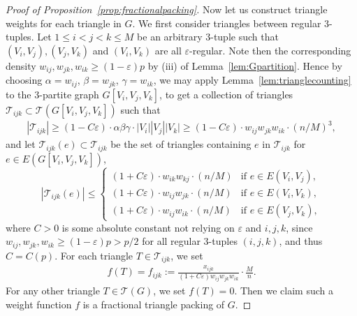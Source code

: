 \documentclass[10pt,a4paper]{amsart}
\newcommand\dT{\mathcal{T}}
\renewcommand\ge{\geqslant}
\renewcommand\geq{\geqslant}
\renewcommand\le{\leqslant}
\renewcommand\leq{\leqslant}
\begin{document}
\begin{proof}[Proof of Proposition~\ref{prop:fractionalpacking}]
Now let us construct triangle weights for each triangle in $G$. We first consider triangles between regular $3$-tuples. Let $1\leq i<j<k\leq M$ be an arbitrary 3-tuple such that $(V_i,V_j),(V_j,V_k)$ and $(V_i,V_k)$ are all $\varepsilon$-regular. Note then the corresponding density $w_{ij},w_{jk}, w_{ik}\geq(1-\varepsilon)p$ by (iii) of Lemma~\ref{lem:Gpartition}. Hence by choosing $\alpha=w_{ij}$, $\beta= w_{jk}$, $\gamma=w_{ik}$, we may apply Lemma~\ref{lem:trianglecounting} to the $3$-partite graph $G[V_i,V_j,V_k]$, to get a collection of triangles $\dT_{ijk}\subset \dT(G[V_i,V_j,V_k])$ such that
\begin{align}\label{eq:dTijk}
|\dT_{ijk}|\ge(1-C\varepsilon)\cdot\alpha\beta\gamma\cdot |V_i||V_j||V_k|\geq (1-C\varepsilon)\cdot w_{ij}w_{jk}w_{ik}\cdot(n/M)^3,   
\end{align}
and let $\dT_{ijk}(e)\subset\dT_{ijk}$ be the set of triangles containing $e$ in $\dT_{ijk}$ for $e\in E(G[V_i,V_j,V_k])$,
\begin{equation}\label{eq:Taue'}
|\dT_{ijk}(e)|\le
\begin{cases}
(1+C\varepsilon)\cdot w_{ik}w_{kj}\cdot (n/M) & \text{if } e \in E(V_i,V_j), \\[4pt]
(1+C\varepsilon)\cdot w_{ij}w_{jk}\cdot (n/M) & \text{if } e \in E(V_i,V_k), \\[4pt]
(1+C\varepsilon)\cdot w_{ij}w_{ik}\cdot(n/M) & \text{if } e \in E(V_j,V_k),
\end{cases}
\end{equation}
where $C>0$ is some absolute constant not relying on $\varepsilon$ and $i,j,k$, since $w_{ij},w_{jk}, w_{ik}\geq(1-\varepsilon)p>p/2$ for all regular 3-tuples $(i,j,k)$, and thus $C=C(p)$. For each triangle  $T\in\dT_{ijk}$, we set
\begin{align}\label{eq:fijk}
f(T)=f_{ijk}:=\frac{x_{ijk}}{(1+C\varepsilon)w_{ij}w_{jk}w_{ik}}\cdot\frac{M}{n}.   
\end{align}
For any other triangle $T\in\dT(G)$, we set $f(T)=0$. Then we claim such a weight function $f$ is a fractional triangle packing of $G$.


\end{proof}
\end{document}
